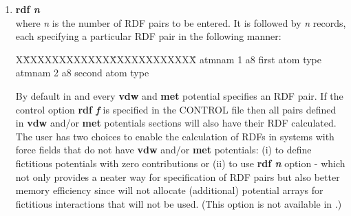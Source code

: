 \begin{enumerate}
\begin{table}[htbp]
\end{table}

\item {\bf rdf {\em n}} \\
where {\em n} is the number of RDF pairs to be entered.  It is
followed by {\em n} records, each specifying a particular RDF pair
in the following manner:
\begin{tabbing}
X\=XXXXXXXXXXXX\=XXXXXXXXXXXX\=\kill
\> atmnam 1     \> a8   \> first atom type \\
\> atmnam 2     \> a8   \> second atom type
\end{tabbing}

By default in \C and \D every {\bf vdw} and {\bf met}
potential specifies an RDF pair.  If the control option
{\bf rdf {\em f}} is specified in the CONTROL file then all pairs
defined in {\bf vdw} and/or {\bf met} potentials sections will
also have their RDF calculated.  The user has two choices to enable
the calculation of RDFs in systems with force fields that do not
have {\bf vdw} and/or {\bf met} potentials: (i) to define fictitious
potentials with zero contributions or (ii) to use {\bf rdf {\em n}}
option - which not only provides a neater way for specification of
RDF pairs but also better memory efficiency since \D will not
allocate (additional) potential arrays for fictitious interactions
that will not be used.  (This option is not available in \C.)


\end{enumerate}
